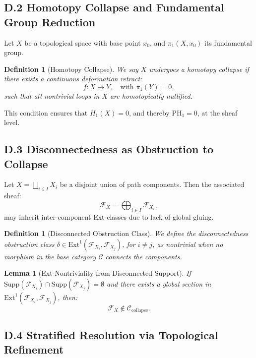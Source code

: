 \documentclass[11pt]{article}
\newtheorem{definition}[theorem]{Definition}
\newtheorem{lemma}[theorem]{Lemma}
\begin{document}
\subsection*{D.2 Homotopy Collapse and Fundamental Group Reduction}

Let \( X \) be a topological space with base point \( x_0 \), and \( \pi_1(X, x_0) \) its fundamental group.

\begin{definition}[Homotopy Collapse]
We say \( X \) undergoes a \emph{homotopy collapse} if there exists a continuous deformation retract:
\[
f: X \to Y, \quad \text{with } \pi_1(Y) = 0,
\]
such that all nontrivial loops in \( X \) are homotopically nullified.
\end{definition}

This condition ensures that \( H_1(X) = 0 \), and thereby \( \mathrm{PH}_1 = 0 \), at the sheaf level.

\subsection*{D.3 Disconnectedness as Obstruction to Collapse}

Let \( X = \bigsqcup_{i \in I} X_i \) be a disjoint union of path components. Then the associated sheaf:
\[
\mathcal{F}_X = \bigoplus_{i \in I} \mathcal{F}_{X_i},
\]
may inherit inter-component Ext-classes due to lack of global gluing.

\begin{definition}[Disconnected Obstruction Class]
We define the disconnectedness obstruction class \( \delta \in \mathrm{Ext}^1(\mathcal{F}_{X_i}, \mathcal{F}_{X_j}) \),  
for \( i \ne j \), as nontrivial when no morphism in the base category \(\mathcal{C}\) connects the components.
\end{definition}

\begin{lemma}[Ext-Nontriviality from Disconnected Support]
If \( \mathrm{Supp}(\mathcal{F}_{X_i}) \cap \mathrm{Supp}(\mathcal{F}_{X_j}) = \emptyset \) and there exists  
a global section in \( \mathrm{Ext}^1(\mathcal{F}_{X_i}, \mathcal{F}_{X_j}) \), then:
\[
\mathcal{F}_X \notin \mathcal{C}_{\mathrm{collapse}}.
\]
\end{lemma}

\subsection*{D.4 Stratified Resolution via Topological Refinement}
\end{document}
